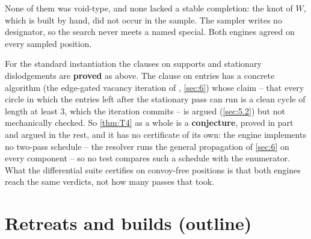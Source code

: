 \documentclass[12pt,a4paper]{article}
\begin{document}
None of them was void-type, and none lacked a stable completion: the knot of $W$, which is built by hand, did not occur in the sample.
The sampler writes no designator, so the search never meets a named special.
Both engines agreed on every sampled position.
\begin{status}
For the standard instantiation the clauses on supports and stationary dislodgements are \textbf{proved} as above.
The clause on entries has a concrete algorithm (the edge-gated vacancy iteration of , \cref{sec:6}) whose claim -- that every circle in which the entries left after the stationary pass can run is a clean cycle of length at least 3, which the iteration commits -- is argued (\cref{sec:5.2}) but not mechanically checked.
So \cref{thm:T4} as a whole is a \textbf{conjecture}, proved in part and argued in the rest, and it has no certificate of its own: the engine implements no two-pass schedule -- the resolver runs the general propagation of \cref{sec:6} on every component -- so no test compares such a schedule with the enumerator.
What the differential suite certifies on convoy-free positions is that both engines reach the same verdicts, not how many passes that took.
\end{status}

\section{Retreats and builds (outline)}\label{sec:9}
\end{document}
